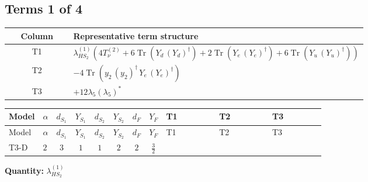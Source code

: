 \documentclass[8pt]{article}
\begin{document}
\begin{landscape}
\subsection*{Terms 1 of 4}
\begin{center}
\begin{tabular}{@{}c >{\raggedright\arraybackslash}p{0.82\linewidth}@{}}
\toprule
Column & Representative term structure \\
\midrule
T1 & \(\displaystyle {\lambda_{HS_2}^{(1)}} (4 T_{\nu}^{(2)}+6 \operatorname{Tr}\!\left({Y_d}\,\left({Y_d}\right)^{\dagger}\right)+2 \operatorname{Tr}\!\left({Y_e}\,\left({Y_e}\right)^{\dagger}\right)+6 \operatorname{Tr}\!\left({Y_u}\,\left({Y_u}\right)^{\dagger}\right))\) \\
\midrule
T2 & \(\displaystyle -4 \operatorname{Tr}\!\left({y_2}\,\left({y_2}\right)^{\dagger}\,{Y_e}\,\left({Y_e}\right)^{\dagger}\right)\) \\
\midrule
T3 & \(\displaystyle +12 {\lambda_5} \left({\lambda_5}\right)^{*}\) \\
\midrule
\bottomrule
\end{tabular}
\end{center}
\smallskip
\tiny
\begin{longtable}{@{}llcccccc >{\raggedright\arraybackslash}p{0.21\linewidth} >{\raggedright\arraybackslash}p{0.21\linewidth} >{\raggedright\arraybackslash}p{0.21\linewidth}@{}}
\toprule
Model & $\alpha$ & $d_{S_1}$ & $Y_{S_1}$ & $d_{S_2}$ & $Y_{S_2}$ & $d_F$ & $Y_F$ & T1 & T2 & T3 \\
\midrule
\endfirsthead
\toprule
Model & $\alpha$ & $d_{S_1}$ & $Y_{S_1}$ & $d_{S_2}$ & $Y_{S_2}$ & $d_F$ & $Y_F$ & T1 & T2 & T3 \\
\midrule
\endhead
T3-D & $2$ & $3$ & $1$ & $1$ & $2$ & $2$ & $\frac{3}{2}$ & \scriptsize\adjustbox{max width=\linewidth}{$\begin{gathered} {\lambda_{HS_2}^{(1)}} (4 T_{\nu}^{(2)}+6 \operatorname{Tr}\!\left({Y_d}\,\left({Y_d}\right)^{\dagger}\right)+2 \operatorname{Tr}\!\left({Y_e}\,\left({Y_e}\right)^{\dagger}\right)+6 \operatorname{Tr}\!\left({Y_u}\,\left({Y_u}\right)^{\dagger}\right))\end{gathered}$} & \scriptsize\adjustbox{max width=\linewidth}{$\begin{gathered} -4 \operatorname{Tr}\!\left({y_2}\,\left({y_2}\right)^{\dagger}\,{Y_e}\,\left({Y_e}\right)^{\dagger}\right)\end{gathered}$} & \scriptsize\adjustbox{max width=\linewidth}{$\begin{gathered} +12 {\lambda_5} \left({\lambda_5}\right)^{*}\end{gathered}$} \\
\midrule
\bottomrule
\end{longtable}
\clearpage
\noindent\textbf{Quantity: }$\lambda_{HS_2}^{(1)}$\par\smallskip

\end{landscape}
\end{document}
